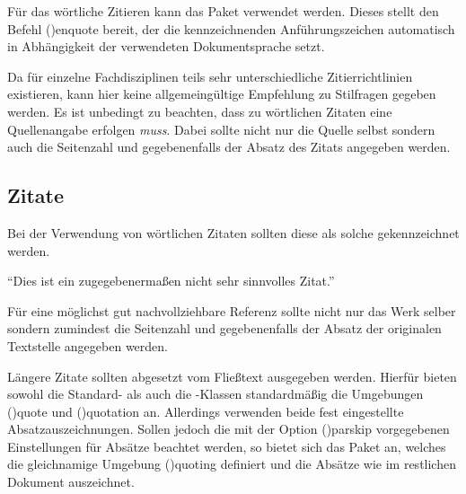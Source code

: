 \documentclass[%
  english,ngerman,%
  cdgeometry=no,DIV=12,%
  cd=false,cdfont=false,cdtitle=true,%
  headings=normal,%
  automark,%
  listof=toc,%
]{tudscrartcl}
\begin{document}
Für das wörtliche Zitieren kann das Paket  verwendet werden. 
Dieses stellt den Befehl \Macro(){enquote} bereit, der die 
kennzeichnenden Anführungszeichen automatisch in Abhängigkeit der verwendeten 
Dokumentsprache setzt. 
%
\begin{Hint}
\usepackage{csquotes}
\end{Hint}
%
Da für einzelne Fachdisziplinen teils sehr unterschiedliche Zitierrichtlinien 
existieren, kann hier keine allgemeingültige Empfehlung zu Stilfragen gegeben 
werden. Es ist unbedingt zu beachten, dass zu wörtlichen Zitaten eine 
Quellenangabe erfolgen \emph{muss}. Dabei sollte nicht nur die Quelle selbst 
sondern auch die Seitenzahl und gegebenenfalls der Absatz des Zitats angegeben 
werden.
%
\begin{refsection}
\begin{Trunk+}
\section{Zitate}

Bei der Verwendung von wörtlichen Zitaten sollten diese als solche 
gekennzeichnet werden.
\end{Trunk+}
\begin{Trunk*}
\enquote{Dies ist ein zugegebenermaßen nicht sehr sinnvolles Zitat.}
\cite[58]{hanisch19}
\end{Trunk*}
\begin{Trunk+}
Für eine möglichst gut nachvollziehbare Referenz sollte nicht nur 
das Werk selber sondern zumindest die Seitenzahl und gegebenenfalls 
der Absatz der originalen Textstelle angegeben werden. 
\end{Trunk+}
%
Längere Zitate sollten abgesetzt vom Fließtext ausgegeben werden. Hierfür 
bieten sowohl die Standard- als auch die \KOMAScript-Klassen standardmäßig 
die Umgebungen \Environment(){quote} und 
\Environment(){quotation} an. Allerdings verwenden beide 
fest eingestellte Absatzauszeichnungen. Sollen jedoch die mit der Option 
\Option(){parskip} vorgegebenen Einstellungen für Absätze 
beachtet werden, so bietet sich das Paket  an, welches die 
gleichnamige Umgebung \Environment(){quoting} definiert und 
die Absätze wie im restlichen Dokument auszeichnet.
%
\begin{Preamble}
\usepackage{quoting}

\end{Preamble}
%
\begin{Trunk*}
\end{Trunk*}
\end{refsection}
\end{document}
